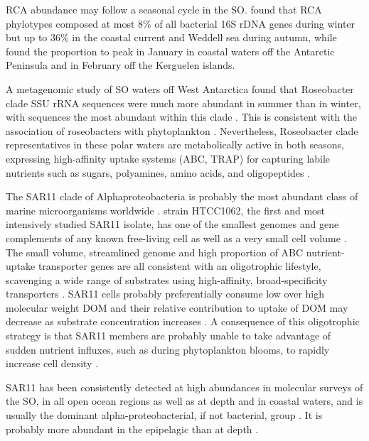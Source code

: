 \ac{RCA} abundance may follow a seasonal cycle in the \ac{SO}.
\citet{Giebel:2009hr} found that \ac{RCA} phylotypes composed at most 8\% of all bacterial 16S rDNA genes during winter but up to 36\% in the coastal current and Weddell sea during autumn, while \citet{Ghiglione:2011ee} found the proportion to peak in January in coastal waters off the Antarctic Peninsula and in February off the Kerguelen islands. 

A metagenomic study of \ac{SO} waters off West Antarctica found that Roseobacter clade \ac{SSU} rRNA sequences were much more abundant in summer than in winter, with  sequences the most abundant within this clade \cite{Grzymski:2012ej}.
This is consistent with the association of roseobacters with phytoplankton \cite{Moran:2003cwa}.
Nevertheless, Roseobacter clade representatives in these polar waters are metabolically active in both seasons, expressing high-affinity uptake systems (ABC, TRAP) for capturing labile nutrients such as sugars, polyamines, amino acids, and oligopeptides \cite{Williams:2012bs}.


The SAR11 clade of Alphaproteobacteria is probably the most abundant class of marine microorganisms worldwide \cite{Morris:2002bn}.
 strain HTCC1062, the first and most intensively studied SAR11 isolate, has one of the smallest genomes and gene complements of any known free-living cell as well as a very small cell volume \cite{Giovannoni:2005ib}.
The small volume, streamlined genome and high proportion of ABC nutrient-uptake transporter genes are all consistent with an oligotrophic lifestyle, scavenging a wide range of substrates using high-affinity, broad-specificity transporters \cite{Giovannoni:2005ib,Lauro:2009gx,Sowell:2008ks}.
SAR11 cells probably preferentially consume low over high molecular weight \ac{DOM} \cite{Malmstrom:2005el} and their relative contribution to uptake of \ac{DOM} may decrease as substrate concentration increases \cite{Alonso:2006dj}.
A consequence of this oligotrophic strategy is that SAR11 members are probably unable to take advantage of sudden nutrient influxes, such as during phytoplankton blooms, to rapidly increase cell density \cite{Tripp:2008dd}.

SAR11 has been consistently detected at high abundances in molecular surveys of the \ac{SO}, in all open ocean regions as well as at depth and in coastal waters, and is usually the dominant alpha-proteobacterial, if not bacterial, group \cite{Giebel:2009hr,Murray:2007db,LopezGarcia:2001vp,Straza:2010io,Jamieson:2012up,GarciaMartinez:2000fu,Ghiglione:2011ee,Murray:2011ib,Piquet:2011fj}.
It is probably more abundant in the epipelagic than at depth \cite{Giebel:2009hr}.

